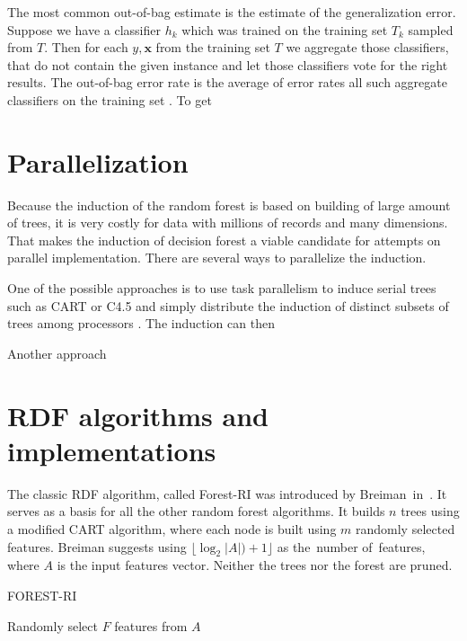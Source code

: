 \documentclass[thesis=B,english]{FITthesis}[2012/10/20]
\begin{document}
	The most common out-of-bag estimate is the estimate of the generalization error. Suppose we have a classifier \(h_k\) which was trained on the training set \(T_k\) sampled from \(T\). Then for each \(y,\mathbf{x}\) from the training set \(T\) we aggregate those classifiers, that do not contain the given instance and let those classifiers vote for the right results. The out-of-bag error rate is the average of error rates all such aggregate classifiers on the training set \cite{breiman1996out}. To get 

	\section{Parallelization}
	Because the induction of the random forest is based on building of large amount of trees, it is very costly for data with millions of records and many dimensions. That makes the induction of decision forest a viable candidate for attempts on parallel implementation. There are several ways to parallelize the induction.

	One of the possible approaches is to use task parallelism to induce serial trees such as CART or C4.5 and simply distribute the induction of distinct subsets of trees among processors \cite{RED13}. The induction can then 

	Another approach 

	\section{RDF algorithms and implementations}
	The classic RDF algorithm, called Forest-RI was introduced by Breiman~in~\cite{BR01}. It serves as a basis for all the other random forest algorithms. It builds \(n\) trees using a modified CART algorithm, where each node is built using \(m\) randomly selected features. Breiman suggests using \(\lfloor \log_2|A|)+1\rfloor\) as the~number of~features, where \(A\) is the input features vector. Neither the trees nor the forest are pruned.
	\begin{algorithm}[H]
		\caption{FOREST-RI}
		\label{alg:forestri}
		\begin{algorithmic}
					Randomly select $F$ features from $A$

				\EndFor
			\EndFunction
		\end{algorithmic}
	\end{algorithm}
\end{document}
